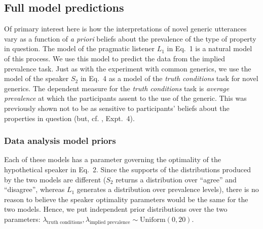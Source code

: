 \documentclass[10pt,letterpaper]{article}
\newcommand{\red}[1]{\textcolor{Red}{#1}}
\begin{document}

\subsection{Full model predictions}


Of primary interest here is how the interpretations of novel generic utterances vary as a function of \emph{a priori} beliefs about the prevalence of the type of property in question.
The model of the pragmatic listener $L_1$ in Eq.~1 is a natural model of this process.
We use this model to predict the data from the implied prevalence task.
Just as with the experiment with common generics, we use the model of the speaker $S_2$ in Eq.~4 as a model of the \emph{truth conditions} task for novel generics.
The dependent measure for the \emph{truth conditions} task is \emph{average prevalence} at which the participants assent to the use of the generic. 
This was previously shown not to be as sensitive to participants' beliefs about the properties in question (but, cf. , Expt.~4).

\subsubsection{Data analysis model priors}
\label{sec:bdapriors4}

Each of these models has a parameter governing the optimality of the hypothetical speaker in Eq.~2. 
Since the supports of the distributions produced by the two models are different ($S_2$ returns a distribution over ``agree'' and ``disagree'', whereas $L_1$ generates a distribution over prevalence levels), there is no reason to believe the speaker optimality parameters would be the same for the two models. 
Hence, we put independent prior distributions over the two parameters: $\lambda_{\text{truth conditions}}, \lambda_{\text{implied prevalence}} \sim \text{Uniform}(0, 20)$.
\end{document}
